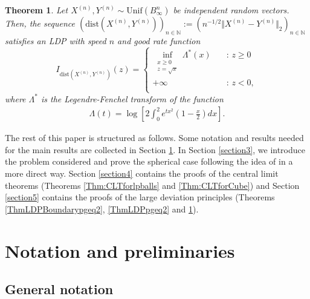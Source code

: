 \documentclass[10pt]{amsart}
\newtheorem{theorem}{Theorem}[section]
\newcounter{theor}
\def\N{\mathbb{N}}
\numberwithin{equation}{section}
\begin{document}
\begin{theorem}
\label{ThmLDPBoundaryCube}
Let $X^{(n)} , Y^{(n)} \sim \text{Unif} ( B_\infty^n)$ be independent random vectors. Then, the sequence $\left( \text{dist}(X^{(n)} , Y^{(n)}) \right)_{n \in \N} := \left( n^{ - 1/2} \Vert X^{(n)} - Y^{(n)} \Vert _2 \right)_{n \in \N}$ satisfies an LDP with speed $n$ and good rate function
\[   
I_{\text{dist}(X^{(n)} , Y^{(n)})}(z) = 
     \begin{cases}
       \displaystyle{\inf_{ \substack{x \geq 0 \\ z = \sqrt{x}}} \Lambda^* (x)}  &\quad\text{: }z \geq 0\\
       + \infty &\quad\text{: }z<0 , \\ 
     \end{cases}
\]
where $ \Lambda^* $ is the Legendre-Fenchel transform of the function
\begin{align*}
\Lambda (t) = \log \left[ 2 \int _{0} ^2 e^{t x^2 } \left( 1- \frac{x}{2} \right) dx \right] .
\end{align*}
\end{theorem}


The rest of this paper is structured as follows. Some notation and results needed for the main results are collected in Section \ref{section2}. In Section \ref{section3}, we introduce the problem considered and prove the spherical case following the idea of \cite{H} in a more direct way.  Section \ref{section4} contains the proofs of the central limit theorems (Theorems \ref{Thm:CLTforlpballs} and \ref{Thm:CLTforCube}) and Section \ref{section5} contains the proofs of the large deviation principles (Theorems \ref{ThmLDPBoundarypgeq2}, \ref{ThmLDPpgeq2} and \ref{ThmLDPBoundaryCube}).

 \section{Notation and preliminaries}
 \label{section2}

\subsection{General notation}
\end{document}

